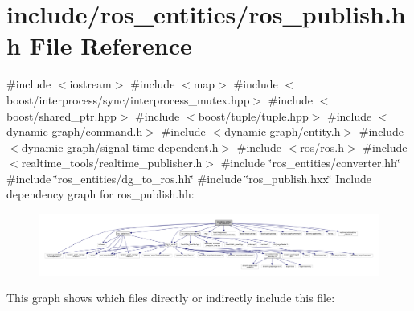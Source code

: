 \hypertarget{ros__publish_8hh}{}\section{include/ros\+\_\+entities/ros\+\_\+publish.hh File Reference}
\label{ros__publish_8hh}
{\ttfamily \#include $<$iostream$>$}\newline
{\ttfamily \#include $<$map$>$}\newline
{\ttfamily \#include $<$boost/interprocess/sync/interprocess\+\_\+mutex.\+hpp$>$}\newline
{\ttfamily \#include $<$boost/shared\+\_\+ptr.\+hpp$>$}\newline
{\ttfamily \#include $<$boost/tuple/tuple.\+hpp$>$}\newline
{\ttfamily \#include $<$dynamic-\/graph/command.\+h$>$}\newline
{\ttfamily \#include $<$dynamic-\/graph/entity.\+h$>$}\newline
{\ttfamily \#include $<$dynamic-\/graph/signal-\/time-\/dependent.\+h$>$}\newline
{\ttfamily \#include $<$ros/ros.\+h$>$}\newline
{\ttfamily \#include $<$realtime\+\_\+tools/realtime\+\_\+publisher.\+h$>$}\newline
{\ttfamily \#include \char`\"{}ros\+\_\+entities/converter.\+hh\char`\"{}}\newline
{\ttfamily \#include \char`\"{}ros\+\_\+entities/dg\+\_\+to\+\_\+ros.\+hh\char`\"{}}\newline
{\ttfamily \#include \char`\"{}ros\+\_\+publish.\+hxx\char`\"{}}\newline
Include dependency graph for ros\+\_\+publish.\+hh\+:
\nopagebreak
\begin{figure}[H]
\begin{center}
\leavevmode
\includegraphics[width=350pt]{ros__publish_8hh__incl}
\end{center}
\end{figure}
This graph shows which files directly or indirectly include this file\+:
\nopagebreak
